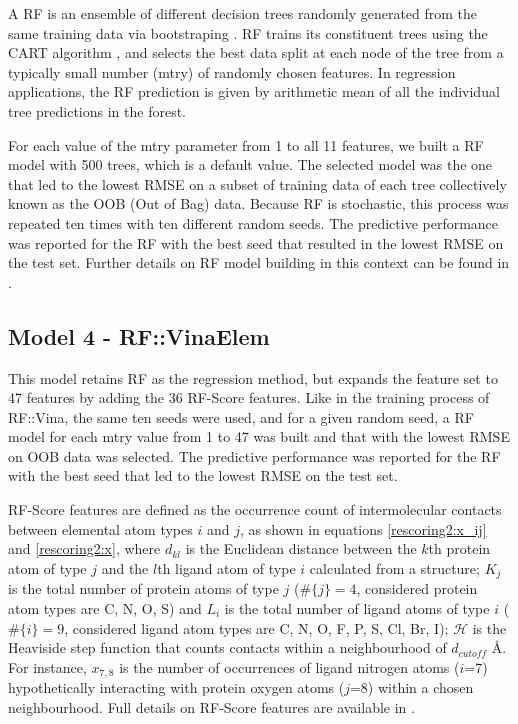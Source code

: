 \documentclass[twocolumn]{bmcart}
\begin{document}
A RF is an ensemble of different decision trees randomly generated from the same training data via bootstraping \cite{1309}. RF trains its constituent trees using the CART algorithm \cite{1310}, and selects the best data split at each node of the tree from a typically small number (mtry) of randomly chosen features. In regression applications, the RF prediction is given by arithmetic mean of all the individual tree predictions in the forest.

For each value of the mtry parameter from 1 to all 11 features, we built a RF model with 500 trees, which is a default value. The selected model was the one that led to the lowest RMSE on a subset of training data of each tree collectively known as the OOB (Out of Bag) data. Because RF is stochastic, this process was repeated ten times with ten different random seeds. The predictive performance was reported for the RF with the best seed that resulted in the lowest RMSE on the test set. Further details on RF model building in this context can be found in \cite{1647}.

\subsection*{Model 4 - RF::VinaElem}

This model retains RF as the regression method, but expands the feature set to 47 features by adding the 36 RF-Score \cite{564} features. Like in the training process of RF::Vina, the same ten seeds were used, and for a given random seed, a RF model for each mtry value from 1 to 47 was built and that with the lowest RMSE on OOB data was selected. The predictive performance was reported for the RF with the best seed that led to the lowest RMSE on the test set.

RF-Score features are defined as the occurrence count of intermolecular contacts between elemental atom types $i$ and $j$, as shown in equations \ref{rescoring2:x_ij} and \ref{rescoring2:x}, where $d_{kl}$ is the Euclidean distance between the $k$th protein atom of type $j$ and the $l$th ligand atom of type $i$ calculated from a structure; $K_j$ is the total number of protein atoms of type $j$ ($\#\{j\}=4$, considered protein atom types are C, N, O, S) and $L_i$ is the total number of ligand atoms of type $i$ ($\#\{i\}=9$, considered ligand atom types are C, N, O, F, P, S, Cl, Br, I); $\mathcal{H}$ is the Heaviside step function that counts contacts within a neighbourhood of $d_{cutoff}$ \AA. For instance, $x_{7,8}$ is the number of occurrences of ligand nitrogen atoms ($i$=7) hypothetically interacting with protein oxygen atoms ($j$=8) within a chosen neighbourhood. Full details on RF-Score features are available in \cite{564,1295}.
\end{document}
